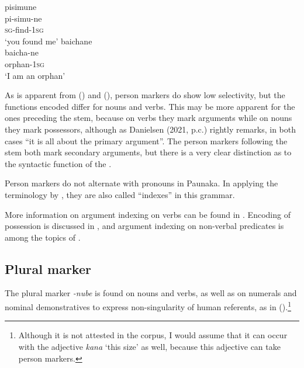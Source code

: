 \ea\label{ex:secondPersonMarkers}
  \ea\label{ex:secondPersonMarkers.1}
\begingl
\glpreamble pisimune\\
\gla pi-simu-ne\\
\textsc{sg}-find-1\textsc{sg}\\
\glft ‘you found me’
\endgl
\newpage
  \ex\label{ex:secondPersonMarkers.2}
\begingl
\glpreamble baichane\\
\gla baicha-ne\\
\glb orphan-1\textsc{sg}\\
\glft ‘I am an orphan’
\endgl
\z
\xe


As is apparent from () and (), person markers do show low selectivity, but the functions encoded differ for nouns and verbs. This may be more apparent for the ones preceding the stem, because on verbs they mark arguments while on nouns they mark possessors, although as Danielsen (2021, p.c.) rightly remarks, in both cases “it is all about the primary argument”. The person markers following the stem both mark secondary arguments, but there is a very clear distinction as to the syntactic function of the . 

Person markers do not alternate with pronouns in Paunaka. In applying the terminology by \citet[]{Haspelmath2013}, they are also called “indexes” in this grammar. 

More information on argument indexing on verbs can be found in . Encoding of possession is discussed in , and argument indexing on non-verbal predicates is among the topics of .


\subsection{Plural marker}\label{sec:AffClPlural}

The plural marker \textit{-nube} is found on nouns and verbs, as well as on numerals and nominal demonstratives to express non-singularity of human referents, as in ().\footnote{Although it is not attested in the corpus, I would assume that it can occur with the adjective \textit{kana} ‘this size’ as well, because this adjective can take person markers.}

